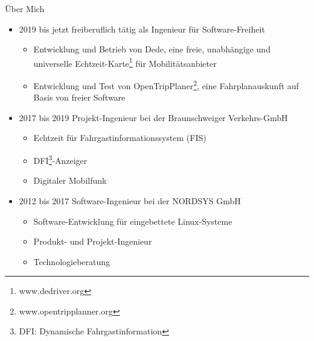 
\begin{frame}{Über Mich}
  \begin{itemize}
  \item<1-1> 2019 bis jetzt freiberuflich tätig als Ingenieur für Software-Freiheit
    \begin{itemize}
    \item<1-1> Entwicklung und Betrieb von Dede, eine freie, unabhängige und universelle Echtzeit-Karte\footnote{www.dedriver.org} für Mobilitätsanbieter
    \item<1-1> Entwicklung und Test von OpenTripPlaner\footnote{www.opentripplanner.org}, eine Fahrplanauskunft auf Basis von freier Software
    \end{itemize}
  \item<2-2> 2017 bis 2019 Projekt-Ingenieur bei der Braunschweiger Verkehrs-GmbH
    \begin{itemize}
    \item<2-2> Echtzeit für Fahrgastinformationssystem (FIS)
    \item<2-2> DFI\footnote{DFI: Dynamische Fahrgastinformation}-Anzeiger
    \item<2-2> Digitaler Mobilfunk
    \end{itemize}
  \item<3-3> 2012 bis 2017 Software-Ingenieur bei der NORDSYS GmbH
    \begin{itemize}
    \item<3-3> Software-Entwicklung für eingebettete Linux-Systeme
    \item<3-3> Produkt- und Projekt-Ingenieur
    \item<3-3> Technologieberatung
    \end{itemize}
  \end{itemize}
\end{frame}
